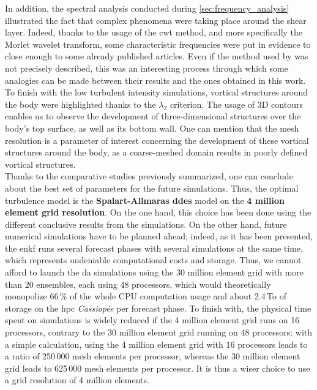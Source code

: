 \documentclass[12pt,twoside]{report}
\newcommand{\Autoref}[1]{%
  \begingroup%
    \def\chapterautorefname{Chapter}%
    \def\sectionautorefname{Section}%
    \def\subsectionautorefname{Subsection}%
    \def\subsubsectionautorefname{Subsubsection}%
    \def\paragraphautorefname{Paragraph}%
    \def\tableautorefname{Table}%
    \def\equationautorefname{Equation}%
    \def\algorithmautorefname{Algorithm}%
    \def\lineautorefname{Step}%
  \autoref{#1}%
  \endgroup%
}
\begin{document}
In addition, the spectral analysis conducted during \Autoref{sec:frequency_analysis} illustrated the fact that complex phenomena were taking place around the shear layer. Indeed, thanks to the usage of the \gls{cwt} method, and more specifically the Morlet wavelet transform, some characteristic frequencies were put in evidence to close enough to some already published articles. Even if the method used by \cite{rocchio_flow_2020} was not precisely described, this was an interesting process through which some analogies can be made between their results and the ones obtained in this work. \\

To finish with the low turbulent intensity simulations, vortical structures around the body were highlighted thanks to the $\lambda_2$ criterion. The usage of 3D contours enables us to observe the development of three-dimensional structures over the body's top surface, as well as its bottom wall. One can mention that the mesh resolution is a parameter of interest concerning the development of these vortical structures around the body, as a coarse-meshed domain results in poorly defined vortical structures. \\

Thanks to the comparative studies previously summarized, one can conclude about the best set of parameters for the future simulations. Thus, the optimal turbulence model is the \textbf{Spalart-Allmaras \gls{ddes}} model on the \textbf{4 million element grid resolution}. On the one hand, this choice has been done using the different conclusive results from the simulations. On the other hand, future numerical simulations have to be planned ahead; indeed, as it has been presented, the \gls{enkf} runs several forecast phases with several simulations at the same time, which represents undeniable computational costs and storage. Thus, we cannot afford to launch the \gls{da} simulations using the 30 million element grid with more than 20 ensembles, each using 48 processors, which would theoretically monopolize 66\,\% of the whole CPU computation usage and about 2.4\,To of storage on the \gls{hpc} \textsl{Cassiopée} per forecast phase. To finish with, the physical time spent on simulations is widely reduced if the 4 million element grid runs on 16 processors, contrary to the 30 million element grid running on 48 processors: with a simple calculation, using the 4 million element grid with 16 processors leads to a ratio of 250\,000 mesh elements per processor, whereas the 30 million element grid leads to 625\,000 mesh elements per processor. It is thus a wiser choice to use a grid resolution of 4 million elements. \\
\end{document}
